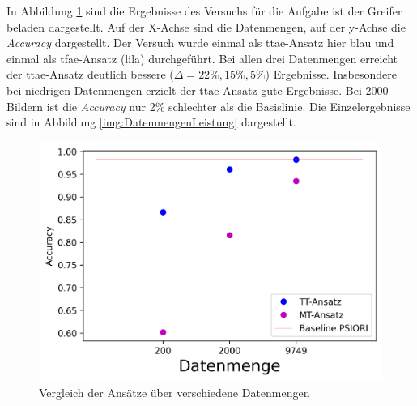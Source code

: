 	In Abbildung \ref{img:VergleichDatenmenge} sind die Ergebnisse des Versuchs für die Aufgabe ist der Greifer beladen dargestellt. Auf der X-Achse sind die Datenmengen, auf der y-Achse die \textit{Accuracy} dargestellt. Der Versuch wurde einmal als \ac{ttae}-Ansatz hier blau und einmal als \ac{tfae}-Ansatz (lila) durchgeführt. Bei allen drei Datenmengen erreicht der \ac{ttae}-Ansatz deutlich bessere ($\Delta=22\%,15\%,5\%$) Ergebnisse. Insbesondere bei niedrigen Datenmengen erzielt der \ac{ttae}-Ansatz gute Ergebnisse. Bei 2000 Bildern ist die \textit{Accuracy} nur 2\% schlechter als die Basislinie. Die Einzelergebnisse sind in Abbildung \ref{img:DatenmengenLeistung} dargestellt.   
	\begin{figure}[h]
		\centering
		\includegraphics[width=1\textwidth, center]{bilder/Hauptteil/Transfer_Logs_Datenmenge/Acc_compare_Logs_data.png}
		\caption{Vergleich der Ansätze über verschiedene Datenmengen}
		\label{img:VergleichDatenmenge}
	\end{figure}  	
